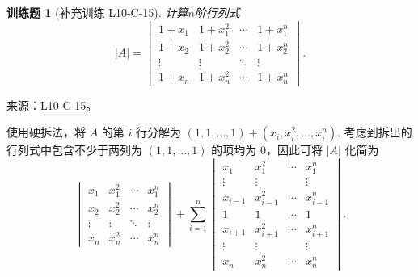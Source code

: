 \documentclass[UTF8,12pt,a4paper,fontset=fandol]{ctexart}
\newtheorem{exercise}{训练题}[section]
\begin{document}
\begin{exercise}[补充训练 L10-C-15]\label{prob:L10-C-15}
计算$n$阶行列式
        \[|A|=\begin{vmatrix}
                1+x_1  & 1+x_1^2 & \cdots & 1+x_1^n \\
                1+x_2  & 1+x_2^2 & \cdots & 1+x_2^n \\
                \vdots & \vdots  & \ddots & \vdots  \\
                1+x_n  & 1+x_n^2 & \cdots & 1+x_n^n
            \end{vmatrix}.\]
\end{exercise}
\noindent 来源：\href{https://github.com/yhwu-is/Linear-Algebra-Left-Undone/blob/new/%E8%AE%B2%E4%B9%89/%E4%B8%93%E9%A2%98/10%20%E8%A1%8C%E5%88%97%E5%BC%8F.tex}{L10-C-15}。
\begin{solve}
使用硬拆法，将 $A$ 的第 $i$ 行分解为 $(1, 1, \ldots, 1) + (x_i, x_i^2, \ldots, x_i^n)$. 考虑到拆出的行列式中包含不少于两列为 $(1, 1, \ldots, 1)$ 的项均为 $0$，因此可将 $|A|$ 化简为
            \[
                \begin{vmatrix}
                    x_1    & x_1^2  & \cdots & x_1^n  \\
                    x_2    & x_2^2  & \cdots & x_2^n  \\
                    \vdots & \vdots & \ddots & \vdots \\
                    x_n    & x_n^2  & \cdots & x_n^n
                \end{vmatrix} + \sum_{i=1}^n \begin{vmatrix}
                    x_1     & x_1^2     & \cdots & x_1^n     \\
                    \vdots  & \vdots    &        & \vdots    \\
                    x_{i-1} & x_{i-1}^2 & \cdots & x_{i-1}^n \\
                    1       & 1         & \cdots & 1         \\
                    x_{i+1} & x_{i+1}^2 & \cdots & x_{i+1}^n \\
                    \vdots  & \vdots    &        & \vdots    \\
                    x_n     & x_n^2     & \cdots & x_n^n
                \end{vmatrix}.
            \]


\end{solve}
\end{document}
